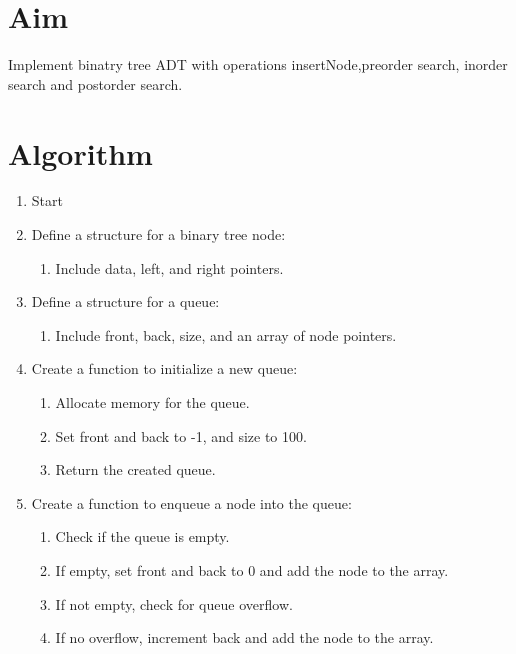 
\section*{Aim}
Implement binatry tree ADT with operations insertNode,preorder search, inorder search and postorder search.
\section{Algorithm}
 {\selectfont

  \begin{enumerate}[label=\arabic*.]
    \item Start

    \item Define a structure for a binary tree node:
          \begin{enumerate}[label=\arabic{enumi}.\arabic*.]
            \item Include data, left, and right pointers.
          \end{enumerate}

    \item Define a structure for a queue:
          \begin{enumerate}[label=\arabic{enumi}.\arabic*.]
            \item Include front, back, size, and an array of node pointers.
          \end{enumerate}

    \item Create a function to initialize a new queue:
          \begin{enumerate}[label=\arabic{enumi}.\arabic*.]
            \item Allocate memory for the queue.
            \item Set front and back to -1, and size to 100.
            \item Return the created queue.
          \end{enumerate}

    \item Create a function to enqueue a node into the queue:
          \begin{enumerate}[label=\arabic{enumi}.\arabic*.]
            \item Check if the queue is empty.
            \item If empty, set front and back to 0 and add the node to the array.
            \item If not empty, check for queue overflow.
            \item If no overflow, increment back and add the node to the array.
          \end{enumerate}


\end{enumerate}}
